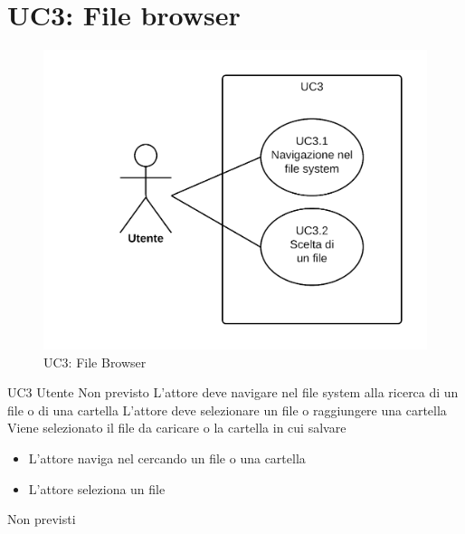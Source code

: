 \documentclass[../AnalisideiRequisiti.tex]{subfiles}
\begin{document}
	\section{UC3: File browser}
	\begin{figure}[H]
		\centering
		\includegraphics[width=\textwidth]{../img/UC3.png}
		\caption{UC3: File Browser}
	\end{figure}
	\UserCase
	{UC3}
	{Utente}
	{Non previsto}
	{L'attore deve navigare nel file system alla ricerca di un file o di una cartella}
	{L'attore deve selezionare un file o raggiungere una cartella}
	{Viene selezionato il file da caricare o la cartella in cui salvare}
	{
		\begin{itemize}
			\item{} L'attore naviga nel  cercando un file o una cartella 
			\item{} L'attore seleziona un file 
		\end{itemize}
	}
	{Non previsti}
	
\end{document}
